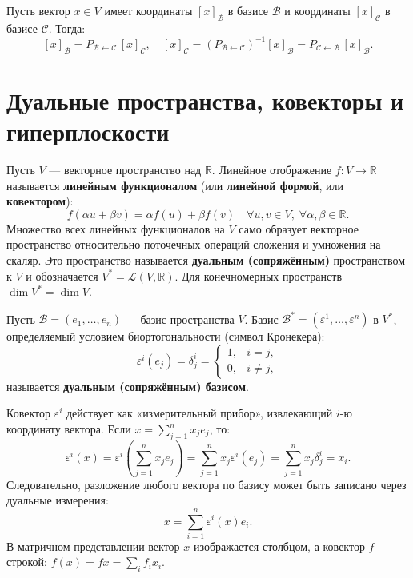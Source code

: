 \begin{theorem}
Пусть вектор $x \in V$ имеет координаты $[x]_\mathcal{B}$ в базисе $\mathcal{B}$ и координаты $[x]_\mathcal{C}$ в базисе
$\mathcal{C}$.
Тогда:
\[ [x]_\mathcal{B} = P_{\mathcal{B} \leftarrow \mathcal{C}} \, [x]_\mathcal{C}, \quad [x]_\mathcal{C} =
\left(P_{\mathcal{B} \leftarrow \mathcal{C}}\right)^{-1} [x]_\mathcal{B} = P_{\mathcal{C} \leftarrow \mathcal{B}} \,
[x]_\mathcal{B}. \]
\end{theorem}

\section{Дуальные пространства, ковекторы и гиперплоскости}

\begin{definition}
Пусть $V$ — векторное пространство над $\mathbb{R}$.
Линейное отображение $f \colon V \to \mathbb{R}$ называется \textbf{линейным функционалом} (или \textbf{линейной
формой}, или \textbf{ковектором}):
\[ f(\alpha u + \beta v) = \alpha f(u) + \beta f(v) \quad \forall u, v \in V, \; \forall \alpha, \beta \in \mathbb{R}.\]
Множество всех линейных функционалов на $V$ само образует векторное пространство относительно поточечных операций
сложения и умножения на скаляр.
Это пространство называется \textbf{дуальным (сопряжённым)} пространством к $V$ и обозначается $V^* = \mathcal{L}(V,
\mathbb{R})$.
Для конечномерных пространств $\dim V^* = \dim V$.
\end{definition}

\begin{definition}
Пусть $\mathcal{B} = (e_1, \dots, e_n)$ — базис пространства $V$.
Базис $\mathcal{B}^* = (\varepsilon^1, \dots, \varepsilon^n)$ в $V^*$, определяемый условием биортогональности (символ
Кронекера):
\[ \varepsilon^i(e_j) = \delta^i_j = \begin{cases}
                                         1, & i = j, \\ 0, & i \ne j,
\end{cases} \] называется \textbf{дуальным (сопряжённым) базисом}.
\end{definition}

\begin{remark}
Ковектор $\varepsilon^i$ действует как «измерительный прибор», извлекающий $i$-ю координату вектора.
Если $x = \sum_{j=1}^n x_j e_j$, то:
\[ \varepsilon^i(x) = \varepsilon^i\left(\sum_{j=1}^n x_j e_j\right) = \sum_{j=1}^n x_j \varepsilon^i(e_j) =
\sum_{j=1}^n x_j \delta^i_j = x_i.
\] Следовательно, разложение любого вектора по базису может быть записано через дуальные измерения:
\[ x = \sum_{i=1}^n \varepsilon^i(x) e_i. \]
В матричном представлении вектор $x$ изображается столбцом, а ковектор $f$ — строкой: $f(x) = f x = \sum_i f_i x_i$.
\end{remark}

